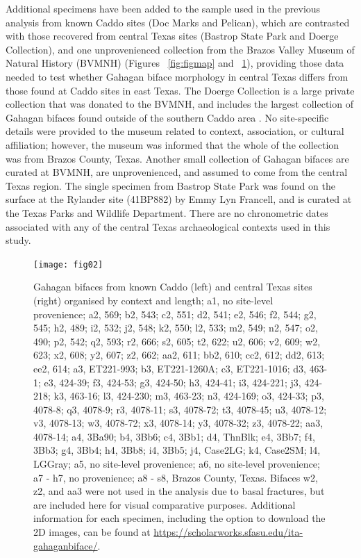 \documentclass[review]{elsarticle}
\begin{document}
Additional specimens have been added to the sample used in the previous analysis from known Caddo sites (Doc Marks and Pelican), which are contrasted with those recovered from central Texas sites (Bastrop State Park and Doerge Collection), and one unprovenienced collection from the Brazos Valley Museum of Natural History (BVMNH) (Figures ~\ref{fig:figmap} and ~\ref{fig:fig2}), providing those data needed to test whether Gahagan biface morphology in central Texas differs from those found at Caddo sites in east Texas. The Doerge Collection is a large private collection that was donated to the BVMNH, and includes the largest collection of Gahagan bifaces found outside of the southern Caddo area \citep[Table 5]{RN4924}. No site-specific details were provided to the museum related to context, association, or cultural affiliation; however, the museum was informed that the whole of the collection was from Brazos County, Texas. Another small collection of Gahagan bifaces are curated at BVMNH, are unprovenienced, and assumed to come from the central Texas region. The single specimen from Bastrop State Park was found on the surface at the Rylander site (41BP882) by Emmy Lyn Francell, and is curated at the Texas Parks and Wildlife Department. There are no chronometric dates associated with any of the central Texas archaeological contexts used in this study.

\begin{figure}[htbp]\centering
\texttt{[image: fig02]}
\caption{Gahagan bifaces from known Caddo (left) and central Texas sites (right) organised by context and length; a1, no site-level provenience; a2, 569; b2, 543; c2, 551; d2, 541; e2, 546; f2, 544; g2, 545; h2, 489; i2, 532; j2, 548; k2, 550; l2, 533; m2, 549; n2, 547; o2, 490; p2, 542; q2, 593; r2, 666; s2, 605; t2, 622; u2, 606; v2, 609; w2, 623; x2, 608; y2, 607; z2, 662; aa2, 611; bb2, 610; cc2, 612; dd2, 613; ee2, 614; a3, ET221-993; b3, ET221-1260A; c3, ET221-1016; d3, 463-1; e3, 424-39; f3, 424-53; g3, 424-50; h3, 424-41; i3, 424-221; j3, 424-218; k3, 463-16; l3, 424-230; m3, 463-23; n3, 424-169; o3, 424-33; p3, 4078-8; q3, 4078-9; r3, 4078-11; s3, 4078-72; t3, 4078-45; u3, 4078-12; v3, 4078-13; w3, 4078-72; x3, 4078-14; y3, 4078-32; z3, 4078-22; aa3, 4078-14; a4, 3Ba90; b4, 3Bb6; c4, 3Bb1; d4, ThnBlk; e4, 3Bb7; f4, 3Bb3; g4, 3Bb4; h4, 3Bb8; i4, 3Bb5; j4, Case2LG; k4, Case2SM; l4, LGGray; a5, no site-level provenience; a6, no site-level provenience; a7 - h7, no provenience; a8 - s8, Brazos County, Texas. Bifaces w2, z2, and aa3 were not used in the analysis due to basal fractures, but are included here for visual comparative purposes. Additional information for each specimen, including the option to download the 2D images, can be found at \href{https://scholarworks.sfasu.edu/ita-gahaganbiface/}{https://scholarworks.sfasu.edu/ita-gahaganbiface/}.}
\label{fig:fig2}
\end{figure}
\end{document}
